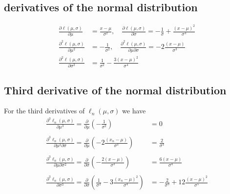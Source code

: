 \subsection{derivatives of the normal distribution}
\begin{equation*}
\begin{split}
    \frac{\partial \ell\left(\mu, \sigma\right)}{\partial\mu} &= \frac{x - \mu}{\sigma^2}, \quad \frac{\partial \ell\left(\mu,\sigma\right)}{\partial \sigma} = - \frac{1}{\sigma} + \frac{\left(x - \mu\right)^2}{\sigma^3} \\
    \frac{\partial^2 \ell\left(\mu, \sigma\right)}{\partial \mu ^2} &= -\frac{1}{\sigma^2}, \quad \frac{\partial^2 \ell\left(\mu, \sigma\right)}{\partial \mu \partial\sigma} = -2\frac{\left(x - \mu\right)}{\sigma^3} \\
    \frac{\partial^2 \ell\left(\mu, \sigma\right)}{\partial \sigma^2} &= \frac{1}{\sigma^2} - \frac{3\left(x - \mu\right)^2}{\sigma^4}
\end{split}
\end{equation*}{}
\subsection{Third derivative of the normal distribution}
For the third derivatives of $\ell_n\left(\mu, \sigma\right)$ we have 
\begin{equation}
  \begin{split}
  \frac{\partial^3 \ell_n\left(\mu, \sigma\right)}{\partial\mu^3} = \frac{\partial}{\partial \mu}\left(-\frac{1}{\sigma^2}\right) &= 0\\ \\
  \frac{\partial^3 \ell_n(\mu, \sigma)}{\partial\mu^2\partial\sigma} = \frac{\partial}{\partial \mu}\left(-2\frac{\left(x_n - \mu\right)}{\sigma^3}\right) & = \frac{2}{\sigma^3} \\ \\
  \frac{\partial^3 \ell_n(\mu, \sigma)}{\partial\mu \partial\sigma^2} = \frac{\partial}{\partial \sigma}\left(-\frac{2\left(x-\mu\right)}{\sigma^3}\right)&= \frac{6\left(x-\mu\right)}{\sigma^4} \\ \\
  \frac{\partial^3\ell_n(\mu, \sigma)}{\partial\sigma^3} = \frac{\partial}{\partial \sigma} \left(\frac{1}{\sigma^2} - 3\frac{\left(x_n - \mu\right)^2}{\sigma^4}\right)  & = -\frac{2}{\sigma^3}  + 12 \frac{\left(x - \mu \right)^2}{\sigma^5}
\end{split}
\end{equation}
